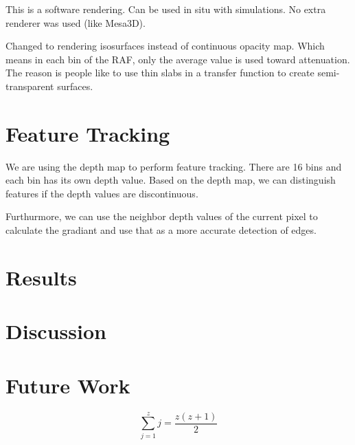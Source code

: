 \documentclass{vgtc}                          %
\begin{document}
This is a software rendering. Can be used in situ with simulations. No extra renderer was used (like Mesa3D).

Changed to rendering isosurfaces instead of continuous opacity map. Which means in each bin of the RAF, only the average value is used toward attenuation. The reason is people like to use thin slabs in a transfer function to create semi-transparent surfaces.

\section{Feature Tracking}

We are using the depth map to perform feature tracking. There are 16 bins and each bin has its own depth value. Based on the depth map, we can distinguish features if the depth values are discontinuous.

Furthurmore, we can use the neighbor depth values of the current pixel to calculate the gradiant and use that as a more accurate detection of edges.

\section{Results}

\section{Discussion}

\section{Future Work}

\begin{equation}
 \sum_{j=1}^{z} j = \frac{z(z+1)}{2}
\end{equation}
\end{document}
